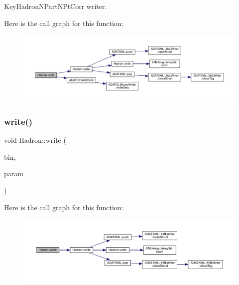 Key\+Hadron\+N\+Part\+N\+Pt\+Corr writer. 

Here is the call graph for this function\+:\nopagebreak
\begin{figure}[H]
\begin{center}
\leavevmode
\includegraphics[width=350pt]{d1/daf/namespaceHadron_adfbaeaa21e67fb5560f0cf7bddc6ce70_cgraph}
\end{center}
\end{figure}
\mbox{\label{namespaceHadron_a70fe8dc6184653dde216306a0f4681d9}} 
\subsubsection{\texorpdfstring{write()}{write()}\hspace{0.1cm}{\footnotesize\ttfamily [60/95]}}
{\footnotesize\ttfamily void Hadron\+::write (\begin{DoxyParamCaption}\item[{\mbox{\hyperlink{classADATIO_1_1BinaryWriter}{Binary\+Writer}} \&}]{bin,  }\item[{const \mbox{\hyperlink{structHadron_1_1HadronDiagramTimeSlices__t}{Hadron\+Diagram\+Time\+Slices\+\_\+t}} \&}]{param }\end{DoxyParamCaption})}

Here is the call graph for this function\+:\nopagebreak
\begin{figure}[H]
\begin{center}
\leavevmode
\includegraphics[width=350pt]{d1/daf/namespaceHadron_a70fe8dc6184653dde216306a0f4681d9_cgraph}
\end{center}
\end{figure}
\mbox{\label{namespaceHadron_af1d6496318c689e52be27a9f842ccc2d}} 
